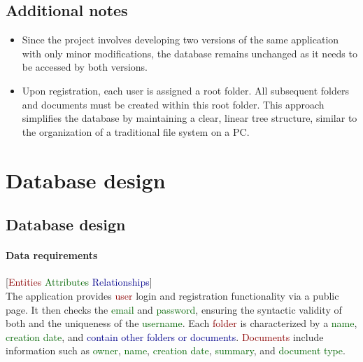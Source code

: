 \documentclass[a4paper,12pt]{article}
\begin{document}
\subsection{Additional notes}
\begin{itemize}
	\item{Since the project involves developing two versions of the same	application with only minor modifications, the database remains unchanged as it needs to be accessed by both versions.}
	\item{Upon registration, each user is assigned a root folder. All subsequent folders and documents must be created within this root folder. This approach simplifies the database by maintaining a clear, linear tree structure, similar to the organization of a traditional file system on a PC.}
\end{itemize}
\newpage

\section{Database design}
\subsection{Database design}
\paragraph{Data requirements}
[\textcolor{darkred}{Entities} \textcolor{darkgreen}{Attributes} \textcolor{darkblue}{Relationships}]\\
The application provides \textcolor{darkred}{user} login and registration functionality via a public page. It then checks the \textcolor{darkgreen}{email} and \textcolor{darkgreen}{password}, ensuring the syntactic validity of both and the uniqueness of the \textcolor{darkgreen}{username}. Each \textcolor{darkred}{folder} is characterized by a \textcolor{darkgreen}{name}, \textcolor{darkgreen}{creation date}, and \textcolor{darkblue}{ contain other folders or documents}. \textcolor{darkred}{Documents} include information such as \textcolor{darkgreen}{owner}, \textcolor{darkgreen}{name}, \textcolor{darkgreen}{creation date}, \textcolor{darkgreen}{summary}, and \textcolor{darkgreen}{document type}.
\end{document}
